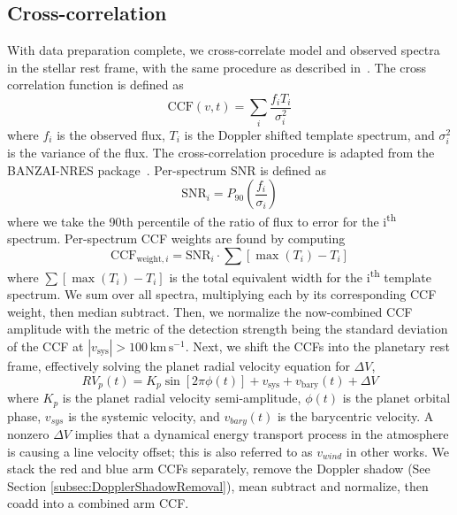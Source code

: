 \documentclass[twocolumn]{aastex631}
\begin{document}
        \subsection{Cross-correlation}\label{subsec:cross-correlation}
            With data preparation complete, we cross-correlate model and observed spectra in the stellar rest frame, with the same procedure as described in~\citet{Johnson2023}. The cross correlation function is defined as
            \begin{equation} \label{equ:CCF}
                \text{CCF}(v,t) = \sum_{i}\frac{f_iT_i}{\sigma_i^{2}} 
            \end{equation} 
            where $f_i$ is the observed flux, $T_i$ is the Doppler shifted template spectrum, and $\sigma_i^2$ is the variance of the flux. The cross-correlation procedure is adapted from the BANZAI-NRES package~\citep{McCully2022}. Per-spectrum SNR is defined as
            \begin{equation} \label{equ:SNR}
                \text{SNR}_i = P_{90}\left(\frac{f_i}{\sigma_i}\right)
            \end{equation}
            where we take the 90th percentile of the ratio of flux to error for the i\textsuperscript{th} spectrum. Per-spectrum CCF weights are found by computing
            \begin{equation}\label{equ:CCF_weight}
                    \text{CCF}_{\text{weight}, i} = \text{SNR}_i  \cdot \sum [ \max(T_i) - T_i ]
            \end{equation}
            where $\sum [ \max(T_i) - T_i ]$ is the total equivalent width for the i\textsuperscript{th} template spectrum.
            We sum over all spectra, multiplying each by its corresponding CCF weight, then median subtract. Then, we normalize the now-combined CCF amplitude with the metric of the detection strength being the standard deviation of the CCF at ${|v_{\text{sys}}| > 100 \, \text{km}\,\text{s}^{-1}}$. Next, we shift the CCFs into the planetary rest frame, effectively solving the planet radial velocity equation for $\Delta V$,
            \begin{equation} \label{equ:RV_p}
                RV_p(t) = K_p\sin[2\pi\phi(t)] + v_{\text{sys}} + v_{\text{bary}}(t) + \Delta V 
            \end{equation}
            where $K_p$ is the planet radial velocity semi-amplitude, $\phi(t)$ is the planet orbital phase, $v_{sys}$ is the systemic velocity, and $v_{bary}(t)$ is the barycentric velocity. A nonzero $\Delta V$ implies that a dynamical energy transport process in the atmosphere is causing a line velocity offset; this is also referred to as $v_{wind}$ in other works. We stack the red and blue arm CCFs separately, remove the Doppler shadow (See Section \ref{subsec:DopplerShadowRemoval}), mean subtract and normalize, then coadd into a combined arm CCF.
\end{document}
